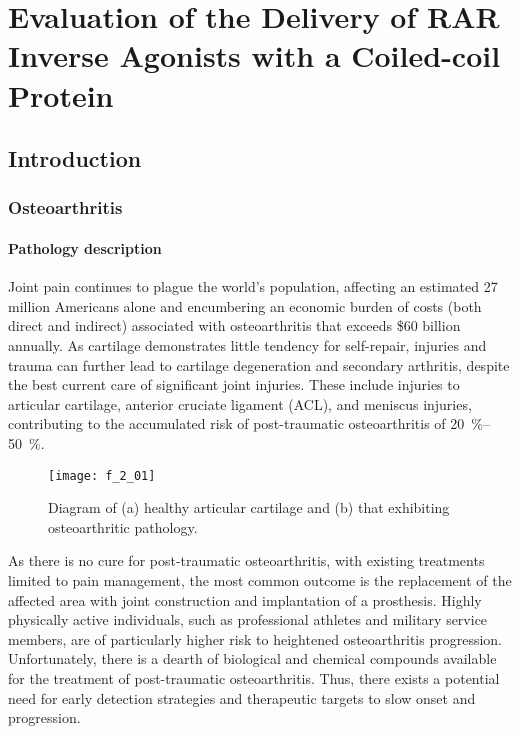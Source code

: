 \chapter{Evaluation of the Delivery of RAR Inverse Agonists with a Coiled-coil
Protein}
\label{chap:comp}

\begin{refsection}

\section{Introduction}

\subsection{Osteoarthritis}

\subsubsection{Pathology description}

Joint pain continues to plague the world's population, affecting an
estimated 27 million Americans alone and encumbering an economic burden of costs
(both direct and indirect) associated with osteoarthritis that exceeds \$60
billion annually.\cite{Brown} As cartilage demonstrates little tendency for
self-repair, injuries and trauma can further lead to cartilage degeneration and
secondary arthritis, despite the best current care of significant joint
injuries.\cite{Helmerhorst2014} These include injuries to articular cartilage,
anterior cruciate ligament (ACL), and meniscus injuries, contributing to the
accumulated risk of post-traumatic osteoarthritis of
\SIrange{20}{50}{\percent}.\cite{Roos1995,Anderson2011,Reiersen1998,Buckwalter2006}
\begin{figure}[h!] \centering \texttt{[image: f\_2\_01]}
    \caption[Diagram of healthy articular cartilage and that exhibiting
    osteoarthritic pathology]{Diagram of (a) healthy articular cartilage and (b)
        that exhibiting osteoarthritic
        pathology.\cite{Wieland2005}}\label{fig:bone_diagram_1} \end{figure}
As there is no cure for post-traumatic osteoarthritis, with existing treatments
limited to pain management, the most common outcome is the replacement of the
affected area with joint construction and implantation of a prosthesis. Highly
physically active individuals, such as professional athletes and military
service members, are of particularly higher risk to heightened osteoarthritis
progression.\cite{Cameron2011} Unfortunately, there is a dearth of biological
and chemical compounds available for the treatment of post-traumatic
osteoarthritis. Thus, there exists a potential need for early detection
strategies and therapeutic targets to slow onset and progression.


\end{refsection}
